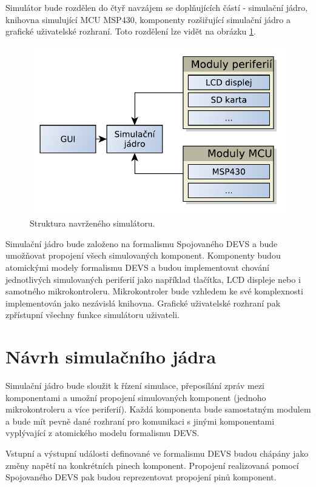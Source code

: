 Simulátor bude rozdělen do čtyř navzájem se doplňujících částí - simulační jádro, knihovna simulující MCU MSP430, komponenty rozšiřující simulační jádro a grafické uživatelské rozhraní. Toto rozdělení lze vidět na obrázku \ref{fig:struktura}.

\begin{figure}[ht]
\centering
\includegraphics[trim=0cm 0cm 0cm 0cm, scale=0.7]{fig/struktura}
\caption{Struktura navrženého simulátoru.}
\label{fig:struktura}
\end{figure}

Simulační jádro bude založeno na formalismu Spojovaného DEVS a bude umožňovat propojení všech simulovaných komponent. Komponenty budou atomickými modely formalismu DEVS a budou implementovat chování jednotlivých simulovaných periferií jako například tlačítka, LCD displeje nebo i samotného mikrokontroleru. Mikrokontroler bude vzhledem ke své komplexnosti implementován jako nezávislá knihovna. Grafické uživatelské rozhraní pak zpřístupní všechny funkce simulátoru uživateli.

\section{Návrh simulačního jádra}

Simulační jádro bude sloužit k řízení simulace, přeposílání zpráv mezi komponentami a umožní propojení simulovaných komponent (jednoho mikrokontroleru a více periferií). Každá komponenta bude samostatným modulem a bude mít pevně dané rozhraní pro komunikaci s jinými komponentami vyplývající z atomického modelu formalismu DEVS.

Vstupní a výstupní události definované ve formalismu DEVS budou chápány jako změny napětí na konkrétních pinech komponent. Propojení realizovaná pomocí Spojovaného DEVS pak budou reprezentovat propojení pinů komponent.

